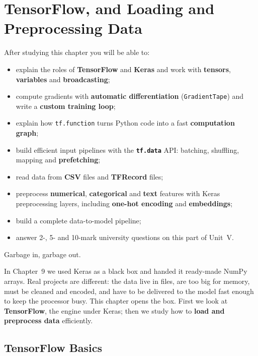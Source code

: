 \chapter{TensorFlow, and Loading and Preprocessing Data}
\label{ch:tf}
\begin{objectives}
After studying this chapter you will be able to:
\begin{itemize}
  \item explain the roles of \textbf{TensorFlow} and \textbf{Keras} and work with \textbf{tensors}, \textbf{variables} and \textbf{broadcasting};
  \item compute gradients with \textbf{automatic differentiation} (\texttt{GradientTape}) and write a \textbf{custom training loop};
  \item explain how \texttt{tf.function} turns Python code into a fast \textbf{computation graph};
  \item build efficient input pipelines with the \textbf{\texttt{tf.data}} API: batching, shuffling, mapping and \textbf{prefetching};
  \item read data from \textbf{CSV} files and \textbf{TFRecord} files;
  \item preprocess \textbf{numerical}, \textbf{categorical} and \textbf{text} features with Keras preprocessing layers, including \textbf{one-hot encoding} and \textbf{embeddings};
  \item build a complete data-to-model pipeline;
  \item answer 2-, 5- and 10-mark university questions on this part of Unit~V.
\end{itemize}
\end{objectives}

\begin{pullquote}
Garbage in, garbage out.
\end{pullquote}

In Chapter~9 we used Keras as a black box and handed it ready-made NumPy arrays. Real projects are different: the data live in files, are too big for memory, must be cleaned and encoded, and have to be delivered to the model fast enough to keep the processor busy. This chapter opens the box. First we look at \textbf{TensorFlow}, the engine under Keras; then we study how to \textbf{load and preprocess data} efficiently.

\section{TensorFlow Basics}

